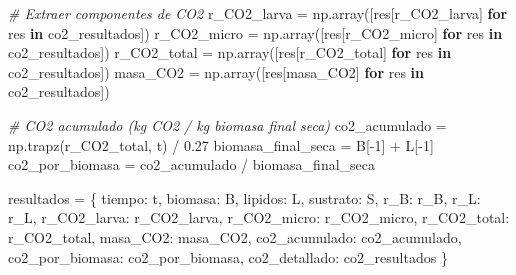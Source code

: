\documentclass[
]{article}
\newenvironment{Shaded}{}{}
\newcommand{\CommentTok}[1]{\textcolor[rgb]{0.38,0.63,0.69}{\textit{#1}}}
\newcommand{\ControlFlowTok}[1]{\textcolor[rgb]{0.00,0.44,0.13}{\textbf{#1}}}
\newcommand{\DecValTok}[1]{\textcolor[rgb]{0.25,0.63,0.44}{#1}}
\newcommand{\FloatTok}[1]{\textcolor[rgb]{0.25,0.63,0.44}{#1}}
\newcommand{\KeywordTok}[1]{\textcolor[rgb]{0.00,0.44,0.13}{\textbf{#1}}}
\newcommand{\NormalTok}[1]{#1}
\newcommand{\OperatorTok}[1]{\textcolor[rgb]{0.40,0.40,0.40}{#1}}
\newcommand{\StringTok}[1]{\textcolor[rgb]{0.25,0.44,0.63}{#1}}
\begin{document}
\begin{Shaded}
\begin{Highlighting}[]
        \CommentTok{\# Extraer componentes de CO2}
\NormalTok{        r\_CO2\_larva }\OperatorTok{=}\NormalTok{ np.array([res[}\StringTok{\textquotesingle{}r\_CO2\_larva\textquotesingle{}}\NormalTok{] }\ControlFlowTok{for}\NormalTok{ res }\KeywordTok{in}\NormalTok{ co2\_resultados])}
\NormalTok{        r\_CO2\_micro }\OperatorTok{=}\NormalTok{ np.array([res[}\StringTok{\textquotesingle{}r\_CO2\_micro\textquotesingle{}}\NormalTok{] }\ControlFlowTok{for}\NormalTok{ res }\KeywordTok{in}\NormalTok{ co2\_resultados])}
\NormalTok{        r\_CO2\_total }\OperatorTok{=}\NormalTok{ np.array([res[}\StringTok{\textquotesingle{}r\_CO2\_total\textquotesingle{}}\NormalTok{] }\ControlFlowTok{for}\NormalTok{ res }\KeywordTok{in}\NormalTok{ co2\_resultados])}
\NormalTok{        masa\_CO2 }\OperatorTok{=}\NormalTok{ np.array([res[}\StringTok{\textquotesingle{}masa\_CO2\textquotesingle{}}\NormalTok{] }\ControlFlowTok{for}\NormalTok{ res }\KeywordTok{in}\NormalTok{ co2\_resultados])}
        
        \CommentTok{\# CO2 acumulado (kg CO2 / kg biomasa final seca)}
\NormalTok{        co2\_acumulado }\OperatorTok{=}\NormalTok{ np.trapz(r\_CO2\_total, t) }\OperatorTok{/} \FloatTok{0.27}
\NormalTok{        biomasa\_final\_seca }\OperatorTok{=}\NormalTok{ B[}\OperatorTok{{-}}\DecValTok{1}\NormalTok{] }\OperatorTok{+}\NormalTok{ L[}\OperatorTok{{-}}\DecValTok{1}\NormalTok{]}
\NormalTok{        co2\_por\_biomasa }\OperatorTok{=}\NormalTok{ co2\_acumulado }\OperatorTok{/}\NormalTok{ biomasa\_final\_seca}
        
\NormalTok{        resultados }\OperatorTok{=}\NormalTok{ \{}
            \StringTok{\textquotesingle{}tiempo\textquotesingle{}}\NormalTok{: t,}
            \StringTok{\textquotesingle{}biomasa\textquotesingle{}}\NormalTok{: B,}
            \StringTok{\textquotesingle{}lipidos\textquotesingle{}}\NormalTok{: L,}
            \StringTok{\textquotesingle{}sustrato\textquotesingle{}}\NormalTok{: S,}
            \StringTok{\textquotesingle{}r\_B\textquotesingle{}}\NormalTok{: r\_B,}
            \StringTok{\textquotesingle{}r\_L\textquotesingle{}}\NormalTok{: r\_L,}
            \StringTok{\textquotesingle{}r\_CO2\_larva\textquotesingle{}}\NormalTok{: r\_CO2\_larva,}
            \StringTok{\textquotesingle{}r\_CO2\_micro\textquotesingle{}}\NormalTok{: r\_CO2\_micro,}
            \StringTok{\textquotesingle{}r\_CO2\_total\textquotesingle{}}\NormalTok{: r\_CO2\_total,}
            \StringTok{\textquotesingle{}masa\_CO2\textquotesingle{}}\NormalTok{: masa\_CO2,}
            \StringTok{\textquotesingle{}co2\_acumulado\textquotesingle{}}\NormalTok{: co2\_acumulado,}
            \StringTok{\textquotesingle{}co2\_por\_biomasa\textquotesingle{}}\NormalTok{: co2\_por\_biomasa,}
            \StringTok{\textquotesingle{}co2\_detallado\textquotesingle{}}\NormalTok{: co2\_resultados}
\NormalTok{        \}}
        

\end{Highlighting}
\end{Shaded}
\end{document}
